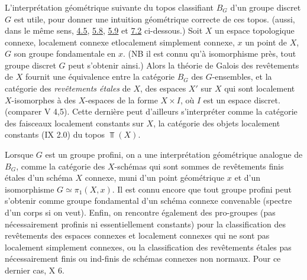 \documentclass[10pt]{../fichiers-configuration-latex/smfart}
\begin{document}
\subsubsection{}
L'interprétation géométrique suivante du topos classifiant
$B_G$ d'un groupe discret $G$ est utile, pour donner une intuition
géométrique correcte de ces topos. (\Cf aussi, dans le même
sens, \hyperref[IV.subsec4.5]{4.5}, \hyperref[IV.subsec5.8]{5.8}, \hyperref[IV.exer5.9]{5.9} et
\hyperref[IV.subsec7.2]{7.2} ci-dessous.) Soit $X$ un espace topologique
connexe, localement connexe et\pageoriginale localement simplement
connexe, $x$ un point de $X$, $G$ son groupe fondamentale en $x$.
(NB il est connu qu'à isomorphisme près, tout groupe discret $G$
peut s'obtenir ainsi.) Alors la théorie de Galois des
revêtements de $X$ fournit une équivalence entre la catégorie
$B_G$ des $G$-ensembles, et la catégorie des \emph{revêtements
étales} de $X$, \ie des espaces $X'$ sur $X$ qui sont localement
$X$-isomorphes à des $X$-espaces de la forme $X\times I$, où $I$
est un espace discret. (comparer  V 4,5). Cette dernière
peut d'ailleurs s'interpréter comme la catégorie des faisceaux
localement constants sur $X$, \ie la catégorie des objets
localement constants (IX 2.0) du topos $\Top(X)$.

Lorsque $G$ est un groupe profini, on a une interprétation
géométrique analogue de $B_G$, comme la catégorie des
$X$-schémas qui sont sommes de revêtements finis étales d'un
schéma $X$ connexe, muni d'un point géométrique $x$ et d'un
isomorphisme $G\simeq \pi_1(X,x)$. Il est connu encore que tout
groupe profini peut s'obtenir comme groupe fondamental d'un schéma
connexe convenable (spectre d'un corps si on veut). Enfin, on
rencontre également des pro-groupes (pas nécessairement profinis
ni essentiellement constants) pour la classification des
revêtements des espaces connexes et localement connexes qui ne
sont pas localement simplement connexes, ou la classification des
revêtements étales pas nécessairement finis ou ind-finis de
schémas connexes non normaux. Pour ce dernier cas, \cf {} X 6.
\end{document}
